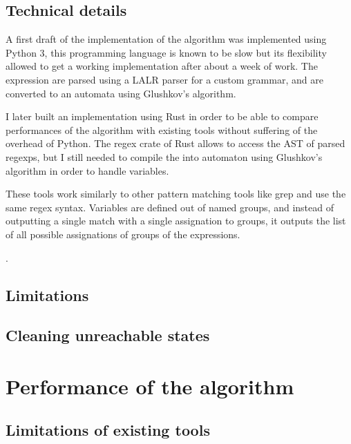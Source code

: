 \documentclass[12px]{article}
\begin{document}
    \subsection{Technical details}


      A first draft of the implementation of the algorithm was implemented
      using Python 3, this programming language is known to be slow but its
      flexibility allowed to get a working implementation after about a week of
      work. The expression are parsed using a LALR parser for a custom grammar,
      and are converted to an automata using Glushkov's algorithm.

      I later built an implementation using Rust in order to be able to compare
      performances of the algorithm with existing tools without suffering of
      the overhead of Python. The regex crate of Rust allows to access the
      AST of parsed regexps, but I still needed to compile the into automaton
      using Glushkov's algorithm in order to handle variables.

      These tools work similarly to other pattern matching tools like grep and
      use the same regex syntax. Variables are defined out of named groups, and
      instead of outputting a single match with a single assignation to groups,
      it outputs the list of all possible assignations of groups of the
      expressions.

      .

    \subsection{Limitations}


    \subsection{Cleaning unreachable states}


  \section{Performance of the algorithm}

    \subsection{Limitations of existing tools}
\end{document}

